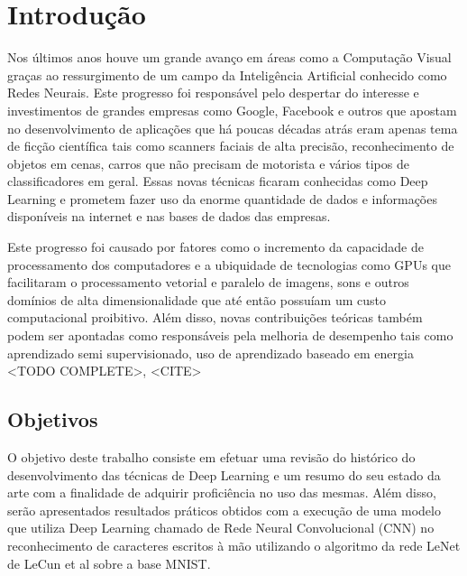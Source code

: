 \chapter{Introdução}

Nos últimos anos houve um grande avanço em áreas como a Computação
Visual graças ao ressurgimento de um campo da Inteligência Artificial conhecido
como Redes Neurais. Este progresso foi responsável pelo despertar do interesse
e investimentos de grandes empresas como Google, Facebook e outros que apostam
no desenvolvimento de aplicações que há poucas décadas atrás eram apenas tema
de ficção científica tais como scanners faciais de alta precisão,
reconhecimento de objetos em cenas, carros que não precisam de motorista e
vários tipos de classificadores em geral. Essas novas técnicas ficaram
conhecidas como Deep Learning e prometem fazer uso da enorme quantidade de
dados e informações disponíveis na internet e nas bases de dados das empresas.

Este progresso foi causado por fatores como o incremento da capacidade de
processamento dos computadores e a ubiquidade de tecnologias como GPUs que
facilitaram o processamento vetorial e paralelo de imagens, sons e outros
domínios de alta dimensionalidade que até então possuíam um custo computacional
proibitivo. Além disso, novas contribuições teóricas também podem ser apontadas
como responsáveis pela melhoria de desempenho tais como aprendizado semi
supervisionado, uso de aprendizado baseado em energia <TODO COMPLETE>, <CITE>

\section{Objetivos}

O objetivo deste trabalho consiste em efetuar uma revisão do
histórico do desenvolvimento das técnicas de Deep Learning e um resumo do seu
estado da arte com a finalidade de adquirir proficiência no uso das mesmas.
Além disso, serão apresentados resultados práticos obtidos com a execução de
uma modelo que utiliza Deep Learning chamado de Rede Neural Convolucional
(CNN) no reconhecimento de caracteres escritos à mão utilizando o algoritmo da
rede LeNet de LeCun et al sobre a base MNIST.\@

